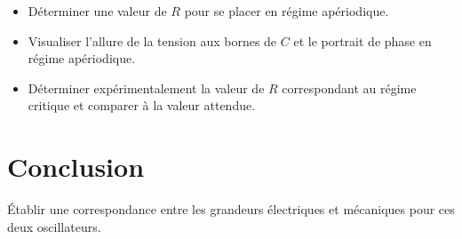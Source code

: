\documentclass{tp}
\begin{document}
\begin{itemize}
  \item Déterminer une valeur de $R$ pour se placer en régime apériodique.

  \item Visualiser l'allure de la tension aux bornes de $C$ et le portrait de phase en régime apériodique.

  \item Déterminer expérimentalement la valeur de $R$ correspondant au régime critique et comparer à la valeur attendue.
\end{itemize}

\section{Conclusion}%
\label{sec:conclusion}

Établir une correspondance entre les grandeurs électriques et mécaniques pour ces deux oscillateurs.
\end{document}
